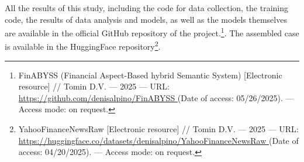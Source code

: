 All the results of this study, including the code for data collection, the training code, the results of data analysis and models, as well as the models themselves are available
in the official GitHub repository of the project.\footnote{FinABYSS (Financial Aspect-Based hybrid Semantic System) [Electronic resource] //
Tomin D.V. --- 2025 --- URL: \url{https://github.com/denisalpino/FinABYSS } (Date of access: 05/26/2025). --- Access mode: on request.}.
The assembled case is available in the HuggingFace repository\footnote{YahooFinanceNewsRaw [Electronic resource] //
Tomin D.V. --- 2025 --- URL: \url{https://huggingface.co/datasets/denisalpino/YahooFinanceNewsRaw } (Date of access: 04/20/2025). --- Access mode: on request.}.